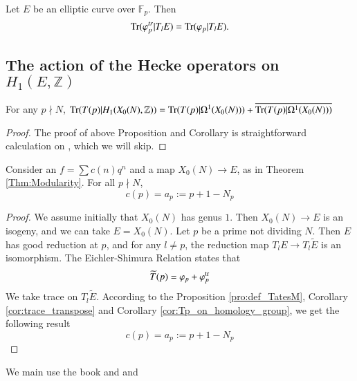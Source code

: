 \documentclass[11pt]{article}
\begin{document}
 \begin{corollary}
    Let $E$ be an elliptic curve over $\mathbb{F}_p$. Then 
    \begin{equation*}
        {\rm Tr} (\varphi_p^{tr}|T_l E)={\rm Tr}(\varphi_p|T_l E).
    \end{equation*}
    \label{cor:trace_transpose}
\end{corollary}
 \subsection{The action of the Hecke operators on $H_1(E,\mathbb{Z})$}
 \begin{corollary}
    For any $p\nmid N$,
    ${\rm Tr}(T(p)|H_1(X_0(N),\mathbb{Z}))={\rm Tr }(T(p)|\Omega^1(X_0(N)))+\overline{{\rm Tr}(T(p)|\Omega^1(X_0(N)))}$
    \label{cor:Tp_on_homology_group}
 \end{corollary}
 \begin{proof}
    The proof of above Proposition and Corollary is straightforward calculation on \cite{Mil06}, which we will skip. 
 \end{proof}

 \begin{theorem}
    Consider an $f=\sum c(n)q^n$ and a map $X_0(N)\rightarrow E$, as in Theorem \ref{Thm:Modularity}. For all $p\nmid N$,
    \begin{equation*}
        c(p)=a_p:=p+1-N_p
    \end{equation*}
 \end{theorem}
 \begin{proof}
    We assume initially that $X_0(N)$ has genus $1$. Then $X_0(N) \longrightarrow E$ is an isogeny, and we can take 
    $E=X_0(N)$. Let $p$ be a prime not dividing $N$. Then $E$ has good reduction at $p$, and for any $l\neq p$, the 
    reduction map $T_lE \longrightarrow T_l\widetilde{E}$ is an isomorphism. The Eichler-Shimura Relation states that 
    \begin{equation*}
        \widetilde{T}(p)=\varphi_p+\varphi_p^{\rm tr}
    \end{equation*}
    We take trace on $T_l\widetilde{E}$. According to the Proposition \ref{pro:def_TatesM}, Corollary \ref{cor:trace_transpose} and 
    Corollary \ref{cor:Tp_on_homology_group}, we get the following result
    \begin{equation*}
        c(p)=a_p:=p+1-N_p
    \end{equation*}
 \end{proof}

 

We main use the book \cite{Mil06} and \cite{Fry05} and \cite{Atk70}
\clearpage

 \printbibliography[title={Bibliography}]
\end{document}
